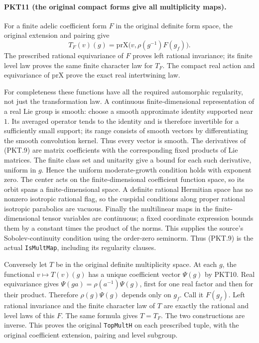 \paragraph{PKT11 (the original compact forms give all multiplicity maps).}\label{claim:PKT11}
For a finite adelic coefficient form $F$ in the original definite form space,
the original extension and pairing give
\[
 T_F(v)(g)=\mathrm{prX}\bigl(v,\rho(g^{-1})F(g_f)\bigr).
 \tag{PKT.9}
\]
The prescribed rational equivariance of $F$ proves left rational invariance;
its finite level law proves the same finite character law for $T_F$.
The compact real action and equivariance of $\mathrm{prX}$ prove the exact
real intertwining law.

For completeness these functions have all the required automorphic
regularity, not just the transformation law.  A continuous finite-dimensional
representation of a real Lie group is smooth: choose a smooth approximate
identity supported near $1$.  Its averaged operator tends to the identity
and is therefore invertible for a sufficiently small support; its range
consists of smooth vectors by differentiating the smooth convolution kernel.
Thus every vector is smooth.  The derivatives of (PKT.9) are matrix
coefficients with the corresponding fixed products of Lie matrices.
The finite class set and unitarity give a bound for each such derivative,
uniform in $g$.  Hence the uniform moderate-growth condition holds with
exponent zero.  The center acts on the finite-dimensional coefficient
function space, so its orbit spans a finite-dimensional space.  A definite
rational Hermitian space has no nonzero isotropic rational flag, so the
cuspidal conditions along proper rational isotropic parabolics are vacuous.
Finally the multilinear maps in the finite-dimensional tensor variables are
continuous; a fixed coordinate expression bounds them by a constant times
the product of the norms.  This supplies the source's Sobolev-continuity
condition using the order-zero seminorm.  Thus (PKT.9) is the actual
\texttt{IsMultMap}, including its regularity clauses.

Conversely let $T$ be in the original definite multiplicity space.  At each
$g$, the functional $v\mapsto T(v)(g)$ has a unique coefficient vector
$\Psi(g)$ by PKT10.  Real equivariance gives
$\Psi(ga)=\rho(a^{-1})\Psi(g)$, first for one real factor and then for their
product.  Therefore $\rho(g)\Psi(g)$ depends only on $g_f$.  Call it $F(g_f)$.
Left rational invariance and the finite character law of $T$ are exactly the
rational and level laws of this $F$.  The same formula gives $T=T_F$.
The two constructions are inverse.  This proves the original
\texttt{TopMultH} on each prescribed tuple, with the original coefficient
extension, pairing and level subgroup.

